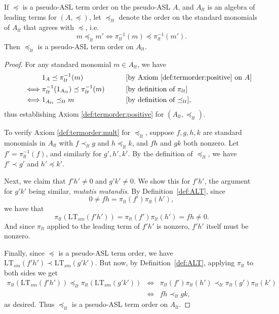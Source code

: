 \documentclass[11pt,reqno]{amsart}
\newcommand*{\eqcomment}[2][\qquad]{#1 &&\text{[#2]}}
\newcommand{\ltsm}{\text{LT}_{sm}}
\theoremstyle{definition}
\numberwithin{equation}{section}
\begin{document}
\begin{proposition} \label{prop:orders}
If $\preceq$ is a pseudo-ASL term order on the pseudo-ASL $A$, and $A_{lt}$ is an algebra of leading terms for $(A,\preceq)$, let $\preceq_{lt}$ denote the order on the standard monomials of $A_{lt}$ that agrees with $\preceq$, i.e. 
\[
m \preceq_{lt} m' \Leftrightarrow \pi_{lt}^{-1}(m) \preceq \pi_{lt}^{-1}(m').
\]
Then $\preceq_{lt} $ is a pseudo-ASL term order on $A_{lt}$.
\end{proposition}

\begin{proof}
For any standard monomial $m \in A_{lt}$, we have
\begin{align}
&1_A \preceq \pi_{lt}^{-1}(m) \eqcomment{by Axiom \ref{def:termorder:positive} on $A$} \nonumber \\
\qquad \iff & \pi_{lt}^{-1}(1_{A_{lt}}) \preceq \pi_{lt}^{-1}(m) \eqcomment{by definition of $\pi_{lt}$} \nonumber \\
\qquad \iff & 1_{A_{lt}} \preceq_{lt} m \eqcomment{by definition of $\preceq_{lt}$}, \nonumber
\end{align}
thus establishing Axiom \ref{def:termorder:positive} for $(A_{lt}, \preceq_{lt})$.

To verify Axiom \ref{def:termorder:mult} for $\preceq_{lt}$, suppose $f,g,h,k$ are standard monomials in $A_{lt}$ with $f \prec_{lt} g$ and $h \preceq_{lt} k$, and $fh$ and $gk$ both nonzero. Let $f' = \pi_{lt}^{-1}(f)$, and similarly for $g',h',k'$. By the definition of $\preceq_{lt}$, we have $f' \prec g'$ and $h' \preceq k'$. 

Next, we claim that $f'h' \neq 0$ and $g'k' \neq 0$. We show this for $f'h'$, the argument for $g'k'$ being similar, \emph{mutatis mutandis}. By Definition~\ref{def:ALT}, since 
\[
0 \neq fh = \pi_{lt}(f')\pi_{lt}(h'),
\]
 we have that
\[
\pi_{lt}(\ltsm(f'h')) = \pi_{lt}(f') \pi_{lt}(h') = fh \neq 0. 
\]
And since $\pi_{lt}$ applied to the leading term of $f'h'$ is nonzero, $f'h'$ itself must be nonzero. 

Finally, since $\preceq$ is a pseudo-ASL term order, we have $\ltsm(f'h') \prec \ltsm(g'k')$. But now, by Definition~\ref{def:ALT}, applying $\pi_{lt}$ to both sides we get 
\begin{eqnarray*}
\pi_{lt}\left(\ltsm(f'h')\right) \preceq_{lt} \pi_{lt}\left(\ltsm(g'k')\right) & \Longleftrightarrow & \pi_{lt}(f') \pi_{lt}(h') \prec_{lt} \pi_{lt}(g') \pi_{lt}(k') \\
 & \Longleftrightarrow & fh \prec_{lt} gk,
\end{eqnarray*}
as desired. Thus $\preceq_{lt}$ is a pseudo-ASL term order on $A_{lt}$.
\end{proof}
\end{document}
